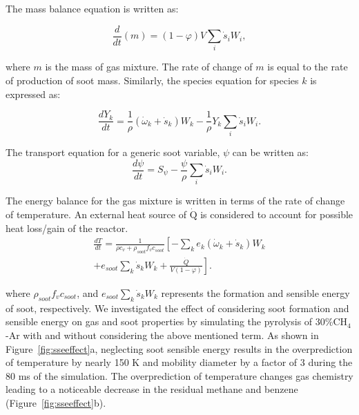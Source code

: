The mass balance equation is written as:

\begin{equation}
	\frac{d}{dt}(m) = (1-\varphi)V \sum_i \dot s_i W_i,
	\label{eqn:contconstuv}
\end{equation} 

\noindent where $m$ is the mass of gas mixture. The rate of change of $m$ is equal to the rate of production of soot mass.
Similarly, the species equation for species $k$ is expressed as:

\begin{equation}
	\frac{dY_k}{dt}
	=
	\frac{1}{\rho}
	\left(
		{\dot{\omega}}_k
		+
		{\dot{s}}_k
	\right)W_k
	-\frac{1}{\rho}Y_k\sum_{i}{{\dot{s}}_i W_i}
	\label{eqn:speciesconstuv}.
\end{equation}

The transport equation for a generic soot variable, $\psi$ can be written as:
\begin{equation}
	\frac{d \psi}{d t}= S_{\psi} - \frac{\psi}{\rho} \sum_i \dot{s}_i W_i
	\label{eqn:sootconstuv}.
\end{equation}

The energy balance for the gas mixture is written in terms of the rate of change of temperature. An external heat source of $\mathrm{\dot{Q}}$ is considered to account for possible heat loss/gain of the reactor.
\begin{equation}
	\begin{split}
		\frac{d T}{d t}=
		\frac{1}{\rho c_v+\rho_{soot}f_v c_{soot}}
		\left[
			-\sum_k e_k
				\left(
					\dot{\omega}_k+\dot{s}_k
				\right) W_k
		\right. \\
		\left.
			+e_{soot}\sum_k \dot{s}_k W_k
			+\frac{\dot{Q}}{V(1-\varphi)}
		\right].
	\end{split}
	\label{eqn:energyconstuv}
\end{equation}

\noindent where $\rho_{soot}f_v c_{soot}$, and $e_{soot}\sum_k \dot{s}_k W_k$ represents the formation and sensible energy of soot, respectively. We investigated the effect of considering soot formation and sensible energy on gas and soot properties by simulating the pyrolysis of 30\%$\mathrm{CH_4}$-Ar with and without considering the above mentioned term. As shown in Figure~\ref{fig:sseeffect}a, neglecting soot sensible energy results in the overprediction of temperature by nearly 150 K and mobility diameter by a factor of 3 during the 80 ms of the simulation. The overprediction of temperature changes gas chemistry leading to a noticeable decrease in the residual methane and benzene (Figure~\ref{fig:sseeffect}b).




